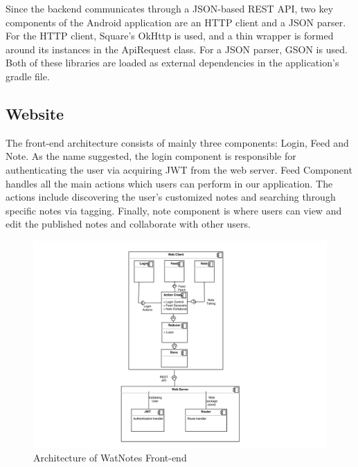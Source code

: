 \documentclass[12pt]{article}
\begin{document}
    Since the backend communicates through a JSON-based REST API, two key components of the
    Android application are an HTTP client and a JSON parser. For the HTTP client, Square's
    OkHttp is used, and a thin wrapper is formed around its instances in the ApiRequest class.
    For a JSON parser, GSON is used. Both of these libraries are loaded as external dependencies
    in the application's gradle file. \\

  \subsection{Website}

  The front-end architecture consists of mainly three components: Login, Feed and Note. As the name suggested, the login component is responsible for authenticating the user via acquiring JWT from the web server. Feed Component handles all the main actions which users can perform in our application. The actions include discovering the user's customized notes and searching through specific notes via tagging. Finally, note component is where users can view and edit the published notes and collaborate with other users. \\

  \begin{figure}[H]
    \includegraphics[width=\textwidth]{assets/frontend_architecture.png}
    \caption{Architecture of WatNotes Front-end}
  \end{figure}
\end{document}
